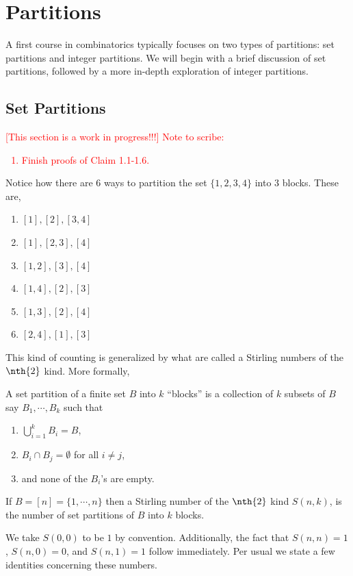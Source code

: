 \chapter{Partitions}
A first course in combinatorics typically focuses on two types of partitions: set partitions and integer partitions. We will begin with a brief discussion of set partitions, followed by a more in-depth exploration of integer partitions. 
\section{Set Partitions}
\textcolor{red}{
[This section is a work in progress!!!] Note to scribe:
\begin{enumerate}
    \item Finish proofs of Claim 1.1-1.6.
\end{enumerate}
}
Notice how there are $6$ ways to partition the set $\{1,2,3,4\}$ into $3$ blocks. These are,
    \begin{enumerate}
        \item $[1],[2],[3,4]$
        \item $[1],[2,3],[4]$
        \item $[1,2],[3],[4]$
        \item $[1,4],[2],[3]$
        \item $[1,3],[2],[4]$
        \item $[2,4],[1],[3]$
    \end{enumerate}
This kind of counting is generalized by what are called a Stirling numbers of the $\nth{2}$ kind. More formally,
\begin{definition}
A set partition of a finite set $B$ into $k$ ``blocks'' is a collection of $k$ subsets of $B$ say $B_1,\cdots,B_k$ such that 
\begin{enumerate}
    \item $\bigcup_{i=1}^kB_i = B$,
    \item $B_i\cap B_j=\emptyset$ for all $i\neq j$,
    \item and none of the $B_i$'s are empty. 
\end{enumerate}
\end{definition}
\begin{definition}
If $B=[n]=\{1,\cdots,n\}$ then a Stirling number of the $\nth{2}$ kind $S(n,k)$, is the number of set partitions of $B$ into $k$ blocks. 
\end{definition}
We take $S(0,0)$ to be $1$ by convention. Additionally, the fact that $S(n,n)=1$, $S(n,0)=0$, and $S(n,1)=1$ follow immediately. Per usual we state a few identities concerning these numbers.
